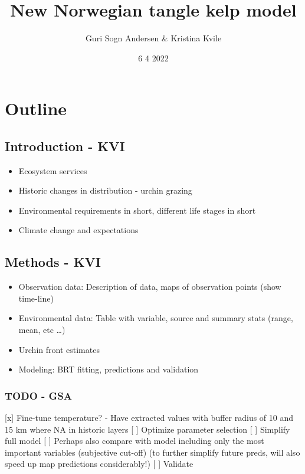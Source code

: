 \documentclass[
]{article}
\title{New Norwegian tangle kelp model}
\author{Guri Sogn Andersen \& Kristina Kvile}
\date{6 4 2022}
\providecommand{\tightlist}{%
  \setlength{\itemsep}{0pt}\setlength{\parskip}{0pt}}
\begin{document}
\maketitle

\hypertarget{outline}{%
\section{Outline}\label{outline}}

\hypertarget{introduction---kvi}{%
\subsection{Introduction - KVI}\label{introduction---kvi}}

\begin{itemize}
\tightlist
\item
  Ecosystem services
\item
  Historic changes in distribution - urchin grazing
\item
  Environmental requirements in short, different life stages in short\\
\item
  Climate change and expectations
\end{itemize}

\hypertarget{methods---kvi}{%
\subsection{Methods - KVI}\label{methods---kvi}}

\begin{itemize}
\tightlist
\item
  Observation data: Description of data, maps of observation points
  (show time-line)
\item
  Environmental data: Table with variable, source and summary stats
  (range, mean, etc \ldots)
\item
  Urchin front estimates
\item
  Modeling: BRT fitting, predictions and validation
\end{itemize}

\hypertarget{todo---gsa}{%
\subsubsection{TODO - GSA}\label{todo---gsa}}

{[}x{]} Fine-tune temperature? - Have extracted values with buffer
radius of 10 and 15 km where NA in historic layers {[} {]} Optimize
parameter selection {[} {]} Simplify full model {[} {]} Perhaps also
compare with model including only the most important variables
(subjective cut-off) (to further simplify future preds, will also speed
up map predictions considerably!) {[} {]} Validate
\end{document}
